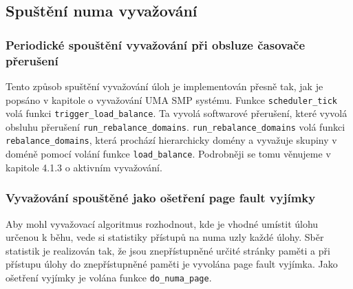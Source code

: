\documentclass[a4paper,12pt]{article}
\begin{document}
\subsection{Spuštění numa vyvažování}

\subsubsection{Periodické spouštění vyvažování při obsluze časovače přerušení}
Tento způsob spuštění vyvažování úloh je implementován přesně tak, jak je popsáno v kapitole o vyvažování UMA SMP systému. Funkce \verb#scheduler_tick# volá funkci \verb#trigger_load_balance#. Ta vyvolá softwarové přerušení, které vyvolá obsluhu přerušení \verb#run_rebalance_domains#. \verb#run_rebalance_domains# volá funkci \verb#rebalance_domains#, která prochází hierarchicky domény a vyvažuje skupiny v doméně pomocí volání funkce \verb#load_balance#. Podrobněji se tomu věnujeme v kapitole 4.1.3 o aktivním vyvažování.

\subsubsection{Vyvažování spouštěné jako ošetření page fault vyjímky}
Aby mohl vyvažovací algoritmus rozhodnout, kde je vhodné umístit úlohu určenou k běhu, vede si statistiky přístupů na numa uzly každé úlohy. Sběr statistik je realizován tak, že jsou znepřístupněné určité stránky paměti a při přístupu úlohy do znepřístupněné paměti je vyvolána page fault vyjímka. Jako ošetření vyjímky je volána funkce \verb#do_numa_page#. 
\end{document}
